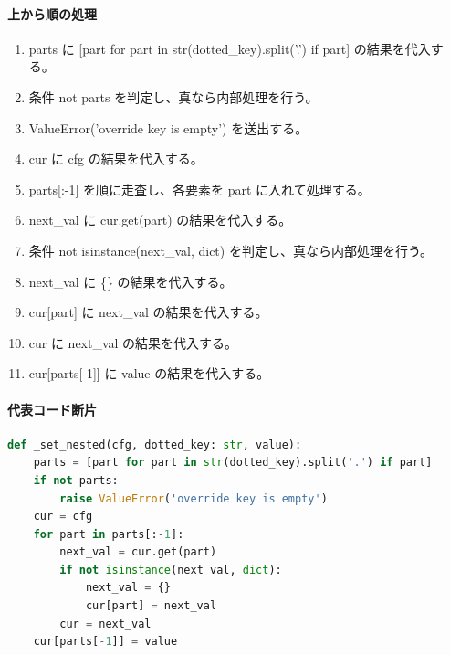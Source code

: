 \documentclass[a4paper,11pt]{article}
\begin{document}
            \paragraph{上から順の処理}
            \begin{enumerate}[leftmargin=1.8em]
            \item parts に [part for part in str(dotted\_key).split('.') if part] の結果を代入する。
\item 条件 not parts を判定し、真なら内部処理を行う。
\item   ValueError('override key is empty') を送出する。
\item cur に cfg の結果を代入する。
\item parts[:-1] を順に走査し、各要素を part に入れて処理する。
\item   next\_val に cur.get(part) の結果を代入する。
\item   条件 not isinstance(next\_val, dict) を判定し、真なら内部処理を行う。
\item     next\_val に \{\} の結果を代入する。
\item     cur[part] に next\_val の結果を代入する。
\item   cur に next\_val の結果を代入する。
\item cur[parts[-1]] に value の結果を代入する。
            \end{enumerate}
            \paragraph{代表コード断片}
            \begin{lstlisting}[language=Python]
def _set_nested(cfg, dotted_key: str, value):
    parts = [part for part in str(dotted_key).split('.') if part]
    if not parts:
        raise ValueError('override key is empty')
    cur = cfg
    for part in parts[:-1]:
        next_val = cur.get(part)
        if not isinstance(next_val, dict):
            next_val = {}
            cur[part] = next_val
        cur = next_val
    cur[parts[-1]] = value
\end{lstlisting}
\end{document}
